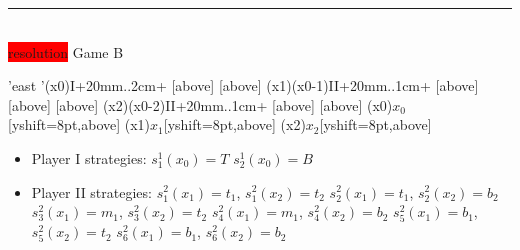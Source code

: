 \documentclass[10pt]{report}
\newenvironment{exercise}[1]
    {\vspace{0.5cm}\hrule\vspace{0.5cm}\noindent\fbox{#1}\\}
    {\vspace{0.5cm}}
\newenvironment{response}
{\vspace{0.2cm}\noindent\colorbox{red}{resolution}}
    {\vspace{0.5cm}}
\begin{document}
\begin{exercise}{3.5}
\begin{response}
		\vspace{0.5cm}
		Game B\\
		\vspace{0.5cm}
		\begin{istgame}[sloped,font=\tiny]
			\setistgrowdirection'{east}
			\setistOvalNodeStyle{.6cm}
			\istrooto'(x0){I}+{20mm}..{2cm}+
			[above]
			[above]
			\endist
			\xtShowEndPoints[oval node, minimum size=6pt]
			\xtdistance{20mm}{10mm}
			\istrooto(x1)(x0-1){II}+{20mm}..{1cm}+
			[above]
			[above]
			[above]
			\endist
			\istrooto(x2)(x0-2){II}+{20mm}..{1cm}+
			[above]
			[above]
			\endist
			\xtOwner(x0){$x_{0}$}[yshift=8pt,above]
			\xtOwner(x1){$x_{1}$}[yshift=8pt,above]
			\xtOwner(x2){$x_{2}$}[yshift=8pt,above]
		\end{istgame}

		\begin{itemize}
			\item Player I strategies:
			      \subitem $s_{1}^{1}(x_{0}) = T$
			      \subitem $s_{2}^{1}(x_{0}) = B$
			\item Player II strategies:
			      \subitem $s_{1}^{2}(x_{1}) = t_{1}$, $s_{1}^{2}(x_{2}) = t_{2}$
			      \subitem $s_{2}^{2}(x_{1}) = t_{1}$, $s_{2}^{2}(x_{2}) = b_{2}$
			      \subitem $s_{3}^{2}(x_{1}) = m_{1}$, $s_{3}^{2}(x_{2}) = t_{2}$
			      \subitem $s_{4}^{2}(x_{1}) = m_{1}$, $s_{4}^{2}(x_{2}) = b_{2}$
			      \subitem $s_{5}^{2}(x_{1}) = b_{1}$, $s_{5}^{2}(x_{2}) = t_{2}$
			      \subitem $s_{6}^{2}(x_{1}) = b_{1}$, $s_{6}^{2}(x_{2}) = b_{2}$
		\end{itemize}


\end{response}
\end{exercise}
\end{document}
